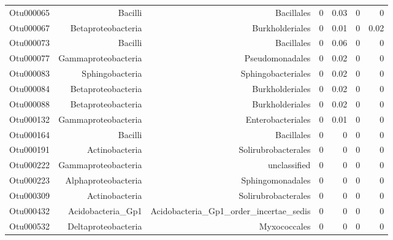 \begin{table}[ht]
\begin{tabular}{crrrrrr}
  Otu000065 & Bacilli & Bacillales & 0 & 0.03 & 0 & 0 \\ 
  Otu000067 & Betaproteobacteria & Burkholderiales & 0 & 0.01 & 0 & 0.02 \\ 
  Otu000073 & Bacilli & Bacillales & 0 & 0.06 & 0 & 0 \\ 
  Otu000077 & Gammaproteobacteria & Pseudomonadales & 0 & 0.02 & 0 & 0 \\ 
  Otu000083 & Sphingobacteria & Sphingobacteriales & 0 & 0.02 & 0 & 0 \\ 
  Otu000084 & Betaproteobacteria & Burkholderiales & 0 & 0.02 & 0 & 0 \\ 
  Otu000088 & Betaproteobacteria & Burkholderiales & 0 & 0.02 & 0 & 0 \\ 
  Otu000132 & Gammaproteobacteria & Enterobacteriales & 0 & 0.01 & 0 & 0 \\ 
  Otu000164 & Bacilli & Bacillales & 0 & 0 & 0 & 0 \\ 
  Otu000191 & Actinobacteria & Solirubrobacterales & 0 & 0 & 0 & 0 \\ 
  Otu000222 & Gammaproteobacteria & unclassified & 0 & 0 & 0 & 0 \\ 
  Otu000223 & Alphaproteobacteria & Sphingomonadales & 0 & 0 & 0 & 0 \\ 
  Otu000309 & Actinobacteria & Solirubrobacterales & 0 & 0 & 0 & 0 \\ 
  Otu000432 & Acidobacteria\_Gp1 & Acidobacteria\_Gp1\_order\_incertae\_sedis & 0 & 0 & 0 & 0 \\ 
  Otu000532 & Deltaproteobacteria & Myxococcales & 0 & 0 & 0 & 0 \\ 
   \hline
\end{tabular}
\end{table}
